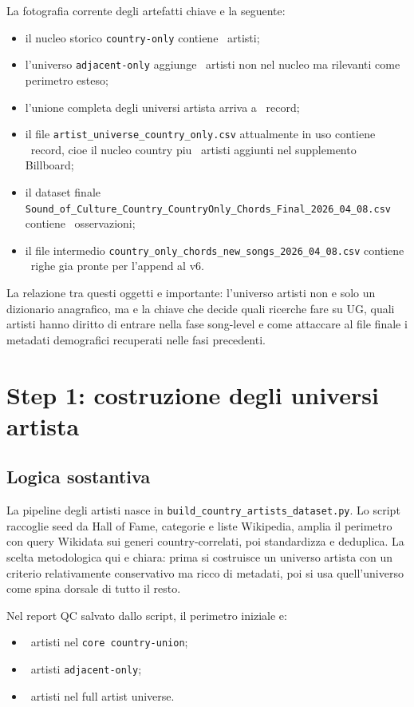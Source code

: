 \documentclass[11pt]{article}
\begin{document}
La fotografia corrente degli artefatti chiave e la seguente:
\begin{itemize}[leftmargin=2em]
\item il nucleo storico \texttt{country-only} contiene \BaseCountryCoreArtists\ artisti;
\item l'universo \texttt{adjacent-only} aggiunge \AdjacentOnlyArtists\ artisti non nel nucleo ma rilevanti come perimetro esteso;
\item l'unione completa degli universi artista arriva a \FullArtistUniverse\ record;
\item il file \texttt{artist\_universe\_country\_only.csv} attualmente in uso contiene \CurrentCountryOnlyArtists\ record, cioe il nucleo country piu \BillboardAddedArtists\ artisti aggiunti nel supplemento Billboard;
\item il dataset finale \texttt{Sound\_of\_Culture\_Country\_CountryOnly\_Chords\_Final\_2026\_04\_08.csv} contiene \CurrentFinalChordRows\ osservazioni;
\item il file intermedio \texttt{country\_only\_chords\_new\_songs\_2026\_04\_08.csv} contiene \CurrentNewSongRows\ righe gia pronte per l'append al v6.
\end{itemize}

La relazione tra questi oggetti e importante: l'universo artisti non e solo un dizionario anagrafico, ma e la chiave che decide quali ricerche fare su UG, quali artisti hanno diritto di entrare nella fase song-level e come attaccare al file finale i metadati demografici recuperati nelle fasi precedenti.

\section{Step 1: costruzione degli universi artista}
\subsection{Logica sostantiva}
La pipeline degli artisti nasce in \texttt{build\_country\_artists\_dataset.py}. Lo script raccoglie seed da Hall of Fame, categorie e liste Wikipedia, amplia il perimetro con query Wikidata sui generi country-correlati, poi standardizza e deduplica. La scelta metodologica qui e chiara: prima si costruisce un universo artista con un criterio relativamente conservativo ma ricco di metadati, poi si usa quell'universo come spina dorsale di tutto il resto.

Nel report QC salvato dallo script, il perimetro iniziale e:
\begin{itemize}[leftmargin=2em]
\item \BaseCountryCoreArtists\ artisti nel \texttt{core country-union};
\item \AdjacentOnlyArtists\ artisti \texttt{adjacent-only};
\item \FullArtistUniverse\ artisti nel full artist universe.
\end{itemize}
\end{document}
